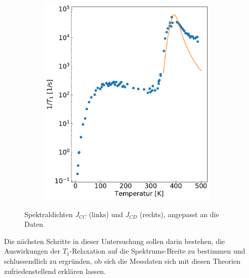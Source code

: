 \begin{figure}[H]
\begin{subfigure}{0.49\textwidth}
		\includegraphics[width=0.95\textwidth]{graphics/zwischenbericht/J_cd.pdf}
	\end{subfigure}
	\caption{Spektraldichten $J_{CC}$ (links) und $J_{CD}$ (rechts), angepasst an die Daten}
	\label{fig:j_cc_j_cd}
\end{figure}

Die nächsten Schritte in dieser Untersuchung sollen darin bestehen, die Auswirkungen der $T_1$-Relaxation auf die Spektrums-Breite zu bestimmen und schlussendlich zu ergründen, ob sich die Messdaten sich mit diesen Theorien zufriedenstellend erklären lassen.



